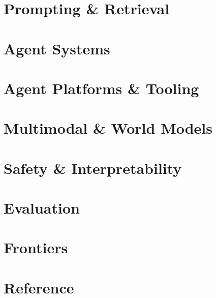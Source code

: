 \documentclass[11pt,a4paper]{article}
\begin{document}
\part{Prompting \& Retrieval}



\part{Agent Systems}






\part{Agent Platforms \& Tooling}




\part{Multimodal \& World Models}







\part{Safety \& Interpretability}



\part{Evaluation}




\part{Frontiers}



\part{Reference}


\end{document}
